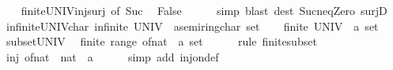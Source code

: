 \begin{isabellebody}
\ \ \isamarkupfalse%
\ finite{\isacharunderscore}{\kern0pt}UNIV{\isacharunderscore}{\kern0pt}inj{\isacharunderscore}{\kern0pt}surj\ {\isacharbrackleft}{\kern0pt}of\ Suc{\isacharbrackright}{\kern0pt}\ \isamarkupfalse%
\ False\isanewline
\ \ \ \ \isamarkupfalse%
\ simp\ {\isacharparenleft}{\kern0pt}blast\ dest{\isacharcolon}{\kern0pt}\ Suc{\isacharunderscore}{\kern0pt}neq{\isacharunderscore}{\kern0pt}Zero\ surjD{\isacharparenright}{\kern0pt}\isanewline
{}\isamarkupfalse%
%
\endisatagproof
{\isafoldproof}%
%
\isadelimproof
\isanewline
%
\endisadelimproof
\isanewline
{}\isamarkupfalse%
\ infinite{\isacharunderscore}{\kern0pt}UNIV{\isacharunderscore}{\kern0pt}char{\isacharunderscore}{\kern0pt}{}{\isacharcolon}{\kern0pt}\ {\isachardoublequoteopen}infinite\ {\isacharparenleft}{\kern0pt}UNIV\ {\isacharcolon}{\kern0pt}{\isacharcolon}{\kern0pt}\ {\isacharprime}{\kern0pt}a{\isacharcolon}{\kern0pt}{\isacharcolon}{\kern0pt}semiring{\isacharunderscore}{\kern0pt}char{\isacharunderscore}{\kern0pt}{}\ set{\isacharparenright}{\kern0pt}{\isachardoublequoteclose}\isanewline
%
\isadelimproof
%
\endisadelimproof
%
\isatagproof
{}\isamarkupfalse%
\isanewline
\ \ \isamarkupfalse%
\ {\isachardoublequoteopen}finite\ {\isacharparenleft}{\kern0pt}UNIV\ {\isacharcolon}{\kern0pt}{\isacharcolon}{\kern0pt}\ {\isacharprime}{\kern0pt}a\ set{\isacharparenright}{\kern0pt}{\isachardoublequoteclose}\isanewline
\ \ \isamarkupfalse%
\ subset{\isacharunderscore}{\kern0pt}UNIV\ \isamarkupfalse%
\ {\isachardoublequoteopen}finite\ {\isacharparenleft}{\kern0pt}range\ of{\isacharunderscore}{\kern0pt}nat\ {\isacharcolon}{\kern0pt}{\isacharcolon}{\kern0pt}\ {\isacharprime}{\kern0pt}a\ set{\isacharparenright}{\kern0pt}{\isachardoublequoteclose}\isanewline
\ \ \ \ \isamarkupfalse%
\ {\isacharparenleft}{\kern0pt}rule\ finite{\isacharunderscore}{\kern0pt}subset{\isacharparenright}{\kern0pt}\isanewline
\ \ \isamarkupfalse%
\ \isamarkupfalse%
\ {\isachardoublequoteopen}inj\ {\isacharparenleft}{\kern0pt}of{\isacharunderscore}{\kern0pt}nat\ {\isacharcolon}{\kern0pt}{\isacharcolon}{\kern0pt}\ nat\ {\isasymRightarrow}\ {\isacharprime}{\kern0pt}a{\isacharparenright}{\kern0pt}{\isachardoublequoteclose}\isanewline
\ \ \ \ \isamarkupfalse%
\ {\isacharparenleft}{\kern0pt}simp\ add{\isacharcolon}{\kern0pt}\ inj{\isacharunderscore}{\kern0pt}on{\isacharunderscore}{\kern0pt}def{\isacharparenright}{\kern0pt}\isanewline

\end{isabellebody}
